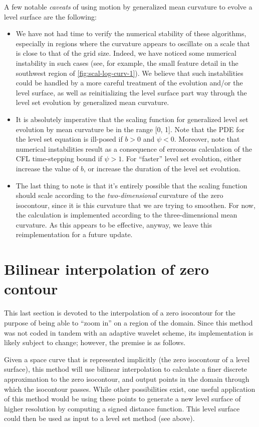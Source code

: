 \documentclass{article}
\begin{document}
A few notable \emph{caveats} of using motion by generalized mean
curvature to evolve a level surface are the following: 
\begin{itemize}
\item We have not had time to verify the numerical stability of
  these algorithms, especially in regions where the curvature
  appears to oscillate on a scale that is close to that of the
  grid size. Indeed, we have noticed some numerical instability in
  such cases (see, for example, the small feature detail in the
  southwest region of \autoref{fig:scal-log-curv-1}). We believe
  that such instabilities could be handled by a more careful
  treatment of the evolution and/or the level surface, as well as
  reinitializing the level surface part way through the level set
  evolution by generalized mean curvature.
\item It is absolutely imperative that the scaling function for
  generalized level set evolution by mean curvature be in the
  range [0, 1]. Note that the PDE for the level set equation is
  ill-posed if $b>0$ and $\psi < 0$. Moreover, note that numerical
  instabilities result as a consequence of erroneous calculation
  of the CFL time-stepping bound if $\psi > 1$. For ``faster''
  level set evolution, either increase the value of $b$, or
  increase the duration of the level set evolution.
\item The last thing to note is that it's entirely possible that
  the scaling function should scale according to the
  \emph{two-dimensional} curvature of the zero isocontour, since
  it is this curvature that we are trying to smoothen. For now,
  the calculation is implemented according to the
  three-dimensional mean curvature. As this appears to be
  effective, anyway, we leave this reimplementation for a future
  update.
\end{itemize}

\section{Bilinear interpolation of zero contour}
\label{sec:bilin-interp-zero}

This last section is devoted to the interpolation of a zero
isocontour for the purpose of being able to ``zoom in'' on a
region of the domain. Since this method was not coded in tandem
with an adaptive wavelet scheme, its implementation is likely
subject to change; however, the premise is as follows. 

Given a space curve that is represented implicitly (\eg the zero
isocontour of a level surface), this method will use bilinear
interpolation to calculate a finer discrete approximation to the
zero isocontour, and output points in the domain through which the
isocontour passes. While other possibilities exist, one useful
application of this method would be using these points to generate
a new level surface of higher resolution by computing a signed
distance function. This level surface could then be used as input
to a level set method (see above).
\end{document}
